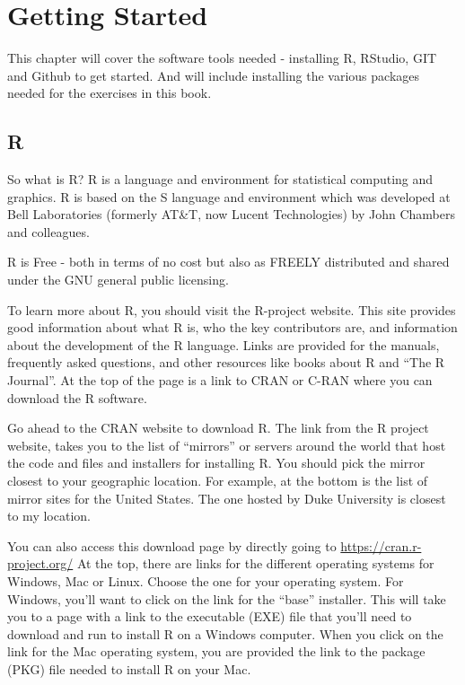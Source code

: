 \documentclass[]{book}
\theoremstyle{definition}
\theoremstyle{definition}
\theoremstyle{definition}
\theoremstyle{remark}
\begin{document}
\chapter{Getting Started}\label{getstarted}

This chapter will cover the software tools needed - installing R,
RStudio, GIT and Github to get started. And will include installing the
various packages needed for the exercises in this book.

\section{R}\label{r}

So what is R? R is a language and environment for statistical computing
and graphics. R is based on the S language and environment which was
developed at Bell Laboratories (formerly AT\&T, now Lucent Technologies)
by John Chambers and colleagues.

R is Free - both in terms of no cost but also as FREELY distributed and
shared under the GNU general public licensing.

To learn more about R, you should visit the R-project website. This site
provides good information about what R is, who the key contributors are,
and information about the development of the R language. Links are
provided for the manuals, frequently asked questions, and other
resources like books about R and ``The R Journal''. At the top of the
page is a link to CRAN or C-RAN where you can download the R software.

Go ahead to the CRAN website to download R. The link from the R project
website, takes you to the list of ``mirrors'' or servers around the
world that host the code and files and installers for installing R. You
should pick the mirror closest to your geographic location. For example,
at the bottom is the list of mirror sites for the United States. The one
hosted by Duke University is closest to my location.

You can also access this download page by directly going to
\url{https://cran.r-project.org/} At the top, there are links for the
different operating systems for Windows, Mac or Linux. Choose the one
for your operating system. For Windows, you'll want to click on the link
for the ``base'' installer. This will take you to a page with a link to
the executable (EXE) file that you'll need to download and run to
install R on a Windows computer. When you click on the link for the Mac
operating system, you are provided the link to the package (PKG) file
needed to install R on your Mac.
\end{document}
